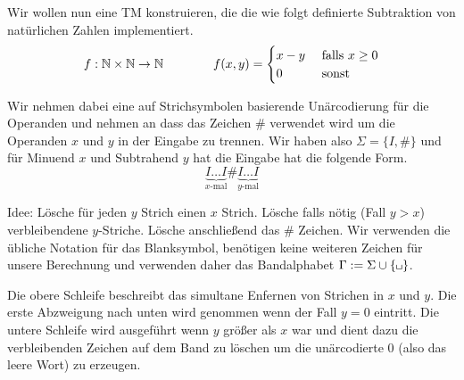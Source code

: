 \begin{Bsp}
Wir wollen nun eine TM konstruieren, die die wie folgt definierte Subtraktion von natürlichen Zahlen implementiert.
% 
% 
$$
f: \mathbb{N}\times\mathbb{N}\rightarrow \mathbb{N}
\qquad \qquad
f(x,y)=
\begin{cases}
 x - y & \text{ falls } x\geq 0\\
 0  & \text{ sonst}
\end{cases}
$$

Wir nehmen dabei eine auf Strichsymbolen basierende Unärcodierung für die Operanden
und nehmen an dass das Zeichen $\#$ verwendet wird um die Operanden $x$ und $y$ in der Eingabe zu trennen.
Wir haben also $\Sigma=\{I,\#\}$ und für Minuend $x$ und Subtrahend $y$ hat die Eingabe hat die folgende Form. 
$$\underbrace{I\ldots I}_{x\text{-mal}}\#\underbrace{I\ldots I}_{y\text{-mal}}$$


Idee: Lösche für jeden $y$ Strich einen $x$ Strich. Lösche falls nötig (Fall $y>x$) verbleibendene $y$-Striche. Lösche anschließend das $\#$ Zeichen.
Wir verwenden die übliche Notation für das Blanksymbol, 
benötigen keine weiteren Zeichen für unsere Berechnung und verwenden daher das Bandalphabet $\Gamma:=\Sigma\cup\{\mblank\}$.

  
  Die obere Schleife beschreibt das simultane Enfernen von Strichen in $x$ und $y$.
  Die erste Abzweigung nach unten wird genommen wenn der Fall $y=0$ eintritt.
  Die untere Schleife wird ausgeführt wenn $y$ größer als $x$ war und dient dazu die verbleibenden Zeichen auf dem Band zu löschen 
  um die unärcodierte $0$ (also das leere Wort) zu erzeugen.
\end{Bsp}
  

